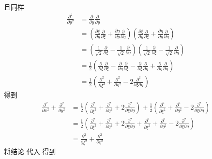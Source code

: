 且同样
\begin{equation}
    \begin{aligned}
        \frac{\partial ^2}{\partial y^2}&=\frac{\partial}{\partial y}\frac{\partial}{\partial y}
\\
&=\left( \frac{\partial \xi}{\partial y}\frac{\partial}{\partial \xi}+\frac{\partial \eta}{\partial y}\frac{\partial}{\partial \eta} \right) \left( \frac{\partial \xi}{\partial y}\frac{\partial}{\partial \xi}+\frac{\partial \eta}{\partial y}\frac{\partial}{\partial \eta} \right) 
\\
&=\left( \frac{1}{\sqrt{2}}\frac{\partial}{\partial \xi}-\frac{1}{\sqrt{2}}\frac{\partial}{\partial \eta} \right) \left( \frac{1}{\sqrt{2}}\frac{\partial}{\partial \xi}-\frac{1}{\sqrt{2}}\frac{\partial}{\partial \eta} \right) 
\\
&=\frac{1}{2}\left( \frac{\partial}{\partial \xi}\frac{\partial}{\partial \xi}-\frac{\partial}{\partial \eta}\frac{\partial}{\partial \xi}-\frac{\partial}{\partial \xi}\frac{\partial}{\partial \eta}+\frac{\partial}{\partial \eta}\frac{\partial}{\partial \eta} \right) 
\\
&=\frac{1}{2}\left( \frac{\partial ^2}{\partial \xi ^2}+\frac{\partial ^2}{\partial \eta ^2}-2\frac{\partial ^2}{\partial \xi \partial \eta} \right) 
    \end{aligned}
\end{equation}
得到
\begin{equation}
    \begin{aligned}
        \frac{\partial ^2}{\partial x^2}+\frac{\partial ^2}{\partial y^2}&=\frac{1}{2}\left( \frac{\partial ^2}{\partial \xi ^2}+\frac{\partial ^2}{\partial \eta ^2}+2\frac{\partial ^2}{\partial \xi \partial \eta} \right) +\frac{1}{2}\left( \frac{\partial ^2}{\partial \xi ^2}+\frac{\partial ^2}{\partial \eta ^2}-2\frac{\partial ^2}{\partial \xi \partial \eta} \right) 
\\
&=\frac{1}{2}\left( \frac{\partial ^2}{\partial \xi ^2}+\frac{\partial ^2}{\partial \eta ^2}+2\frac{\partial ^2}{\partial \xi \partial \eta}+\frac{\partial ^2}{\partial \xi ^2}+\frac{\partial ^2}{\partial \eta ^2}-2\frac{\partial ^2}{\partial \xi \partial \eta} \right) 
\\
&=\frac{\partial ^2}{\partial \xi ^2}+\frac{\partial ^2}{\partial \eta ^2}
    \end{aligned}
\end{equation}
将结论
代入
得到
